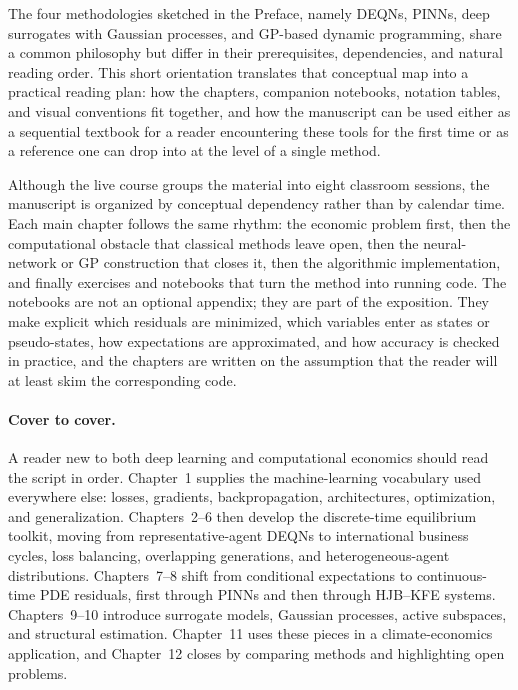 \documentclass[11pt,a4paper]{report}
\begin{document}
The four methodologies sketched in the Preface, namely DEQNs, PINNs, deep surrogates with Gaussian processes, and GP-based dynamic programming, share a common philosophy but differ in their prerequisites, dependencies, and natural reading order.  This short orientation translates that conceptual map into a practical reading plan: how the chapters, companion notebooks, notation tables, and visual conventions fit together, and how the manuscript can be used either as a sequential textbook for a reader encountering these tools for the first time or as a reference one can drop into at the level of a single method.

Although the live course groups the material into eight classroom sessions, the manuscript is organized by conceptual dependency rather than by calendar time.  Each main chapter follows the same rhythm: the economic problem first, then the computational obstacle that classical methods leave open, then the neural-network or GP construction that closes it, then the algorithmic implementation, and finally exercises and notebooks that turn the method into running code.  The notebooks are not an optional appendix; they are part of the exposition.  They make explicit which residuals are minimized, which variables enter as states or pseudo-states, how expectations are approximated, and how accuracy is checked in practice, and the chapters are written on the assumption that the reader will at least skim the corresponding code.

\paragraph{Cover to cover.}
A reader new to both deep learning and computational economics should read the script in order.  Chapter~1 supplies the machine-learning vocabulary used everywhere else: losses, gradients, backpropagation, architectures, optimization, and generalization.  Chapters~2--6 then develop the discrete-time equilibrium toolkit, moving from representative-agent DEQNs to international business cycles, loss balancing, overlapping generations, and heterogeneous-agent distributions.  Chapters~7--8 shift from conditional expectations to continuous-time PDE residuals, first through PINNs and then through HJB--KFE systems.  Chapters~9--10 introduce surrogate models, Gaussian processes, active subspaces, and structural estimation.  Chapter~11 uses these pieces in a climate-economics application, and Chapter~12 closes by comparing methods and highlighting open problems.
\end{document}
